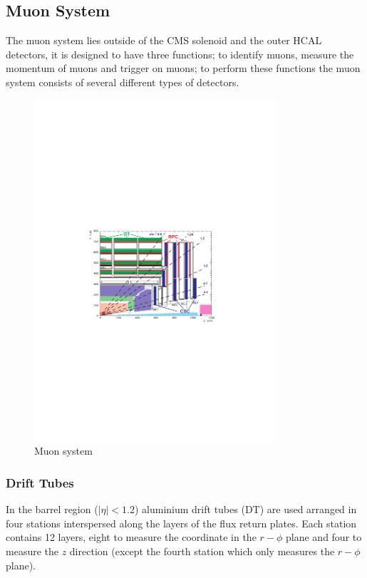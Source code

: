 \subsection{Muon System}
The muon system lies outside of the CMS solenoid and the outer HCAL detectors,
it is designed to have three functions; to identify muons, measure the momentum
of muons and trigger on muons; to perform these functions the muon system
consists of several different types of detectors.

\begin{figure}[ht]
  \centering
  \includegraphics[width=0.8\textwidth]{muon_system}
  \caption{Muon system}
  \label{fig:muon_system}
\end{figure}

\subsubsection{Drift Tubes}
In the barrel region ($|\eta| < 1.2$) aluminium drift tubes (DT) are used
arranged in four stations interspersed along the layers of the flux return
plates. 
Each station contains 12 layers, eight to measure the coordinate in the
$r-\phi$ plane and four to measure the $z$ direction (except the fourth station
which only measures the $r-\phi$ plane). 

